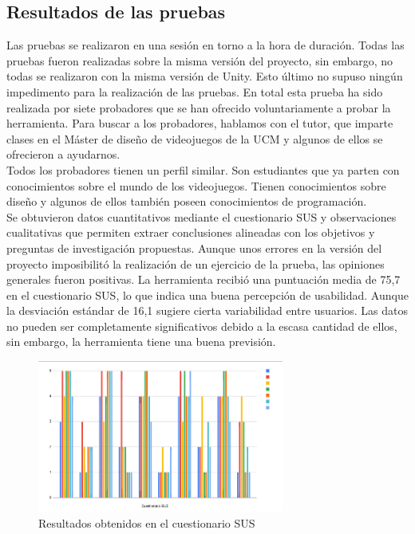 \subsection{Resultados de las pruebas}
Las pruebas se realizaron en una sesión en torno a la hora de duración. Todas las pruebas fueron realizadas sobre la misma versión del proyecto, sin embargo, no todas se realizaron con la misma versión de Unity. Esto último no supuso ningún impedimento para la realización de las pruebas. 
En total esta prueba ha sido realizada por siete probadores que se han ofrecido voluntariamente a probar la herramienta. Para buscar a los probadores, hablamos con el tutor, que imparte clases en el Máster de diseño de videojuegos de la UCM y algunos de ellos se ofrecieron a ayudarnos. \\

Todos los probadores tienen un perfil similar. Son estudiantes que ya parten con conocimientos sobre el mundo de los videojuegos. Tienen conocimientos sobre diseño y algunos de ellos también poseen conocimientos de programación. \\

Se obtuvieron datos cuantitativos mediante el cuestionario SUS y observaciones cualitativas que permiten extraer conclusiones alineadas con los objetivos y preguntas de investigación propuestas. Aunque unos errores en la versión del proyecto imposibilitó la realización de un ejercicio de la prueba, las opiniones generales fueron positivas. La herramienta recibió una puntuación media de 75,7 en el cuestionario SUS, lo que indica una buena percepción de usabilidad. Aunque la desviación estándar de 16,1 sugiere cierta variabilidad entre usuarios. Las datos no pueden ser completamente significativos debido a la escasa cantidad de ellos, sin embargo, la herramienta tiene una buena previsión.

\begin{figure}[t]
	\centering
	\includegraphics[height=5cm]{Imagenes/ResultadosSUS.png}
	\caption{Resultados obtenidos en el cuestionario SUS}
	\label{fig:Cuestionario SUS}
\end{figure}
